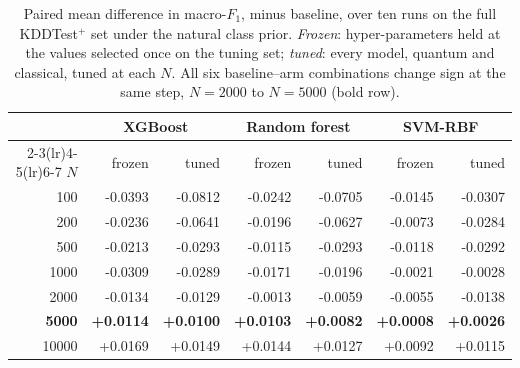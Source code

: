 \begin{table}[t]
\centering
\caption{Paired mean difference in macro-$F_1$, \QSVM{} minus baseline, over ten runs on the
full KDDTest$^+$ set under the natural class prior. \emph{Frozen}: hyper-parameters held at the
values selected once on the tuning set; \emph{tuned}: every model, quantum and classical,
tuned at each $N$.
All six baseline--arm combinations change sign at the same step, $N=2000$ to
$N=5000$ (bold row).}
\label{tab:crossover-arms}
\footnotesize
\setlength{\tabcolsep}{4pt}
\begin{tabular}{@{}r rr rr rr@{}}
\toprule
 & \multicolumn{2}{c}{XGBoost} & \multicolumn{2}{c}{Random forest} & \multicolumn{2}{c}{SVM-RBF} \\
\cmidrule(lr){2-3}\cmidrule(lr){4-5}\cmidrule(lr){6-7}
$N$ & frozen & tuned & frozen & tuned & frozen & tuned \\
\midrule
100 & -0.0393 & -0.0812 & -0.0242 & -0.0705 & -0.0145 & -0.0307 \\
200 & -0.0236 & -0.0641 & -0.0196 & -0.0627 & -0.0073 & -0.0284 \\
500 & -0.0213 & -0.0293 & -0.0115 & -0.0293 & -0.0118 & -0.0292 \\
1000 & -0.0309 & -0.0289 & -0.0171 & -0.0196 & -0.0021 & -0.0028 \\
2000 & -0.0134 & -0.0129 & -0.0013 & -0.0059 & -0.0055 & -0.0138 \\
\textbf{5000} & \textbf{+0.0114} & \textbf{+0.0100} & \textbf{+0.0103} & \textbf{+0.0082} & \textbf{+0.0008} & \textbf{+0.0026} \\
10000 & +0.0169 & +0.0149 & +0.0144 & +0.0127 & +0.0092 & +0.0115 \\
\bottomrule
\end{tabular}
\end{table}
